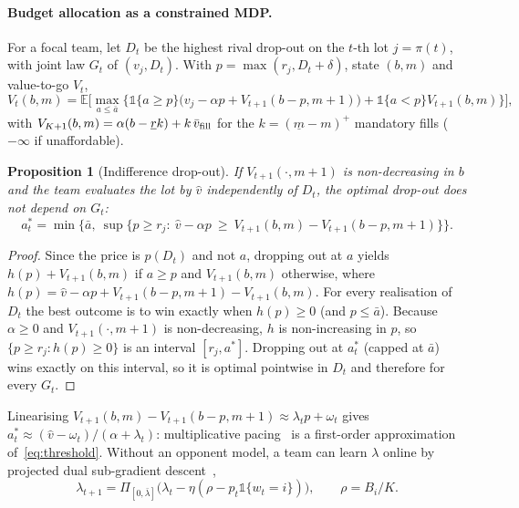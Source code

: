 \documentclass{article}
\newtheorem{proposition}{Proposition}
\newcommand{\E}{\mathbb{E}}
\newcommand{\1}{\mathbb{1}}
\begin{document}
\paragraph{Budget allocation as a constrained MDP.} For a focal team, let $D_t$ be the highest rival drop-out on the $t$-th lot $j=\pi(t)$, with joint law $G_t$ of $(v_j,D_t)$. With $p=\max(r_j,D_t+\delta)$, state $(b,m)$ and value-to-go $V_t$,
\begin{equation}
 V_t(b,m)=\E\Big[\max_{a\le\bar a}\big\{\1\{a\ge p\}\big(v_j-\alpha p+V_{t+1}(b-p,m{+}1)\big)+\1\{a<p\}V_{t+1}(b,m)\big\}\Big],\label{eq:bellman}
\end{equation}
with $V_{K+1}(b,m)=\alpha(b-\underline r k)+k\,\bar v_{\rm fill}$ for the $k=(\underline m-m)^+$ mandatory fills ($-\infty$ if unaffordable).
\begin{proposition}[Indifference drop-out]\label{prop:threshold}
If $V_{t+1}(\cdot,m+1)$ is non-decreasing in $b$ and the team evaluates the lot by $\hat v$ independently of $D_t$, the optimal drop-out does not depend on $G_t$:
\begin{equation}
 a_t^\ast=\min\Big\{\bar a,\ \sup\{p\ge r_j:\ \hat v-\alpha p\ \ge\ V_{t+1}(b,m)-V_{t+1}(b-p,m{+}1)\}\Big\}.\label{eq:threshold}
\end{equation}
\end{proposition}
\begin{proof}
Since the price is $p(D_t)$ and not $a$, dropping out at $a$ yields $h(p)+V_{t+1}(b,m)$ if $a\ge p$ and $V_{t+1}(b,m)$ otherwise, where $h(p)=\hat v-\alpha p+V_{t+1}(b-p,m{+}1)-V_{t+1}(b,m)$. For every realisation of $D_t$ the best outcome is to win exactly when $h(p)\ge0$ (and $p\le\bar a$). Because $\alpha\ge0$ and $V_{t+1}(\cdot,m{+}1)$ is non-decreasing, $h$ is non-increasing in $p$, so $\{p\ge r_j:h(p)\ge0\}$ is an interval $[r_j,a^\ast]$. Dropping out at $a^\ast_t$ (capped at $\bar a$) wins exactly on this interval, so it is optimal pointwise in $D_t$ and therefore for every $G_t$.
\end{proof}
Linearising $V_{t+1}(b,m)-V_{t+1}(b-p,m{+}1)\approx\lambda_tp+\omega_t$ gives $a^\ast_t\approx(\hat v-\omega_t)/(\alpha+\lambda_t)$: multiplicative pacing~\citep{balseiro2019} is a first-order approximation of~\eqref{eq:threshold}. Without an opponent model, a team can learn $\lambda$ online by projected dual sub-gradient descent~\citep{balseiro2019},
\begin{equation}
 \lambda_{t+1}=\Pi_{[0,\bar\lambda]}\big(\lambda_t-\eta(\rho-p_t\1\{w_t=i\})\big),\qquad\rho=B_i/K.\label{eq:dual}
\end{equation}
\end{document}

